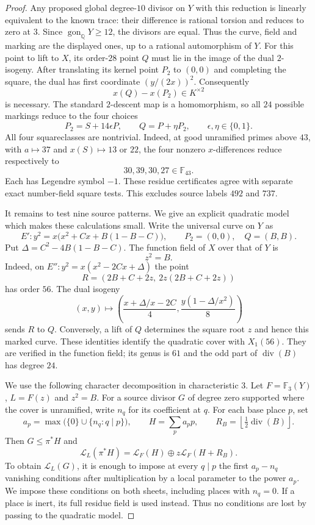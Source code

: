 \begin{proof}
Any proposed global degree-$10$ divisor on $Y$ with this reduction
is linearly equivalent to the known trace: their difference is
rational torsion and reduces to zero at $3$. Since
$\operatorname{gon}_{\mathbb Q}Y\geq12$, the divisors are equal.
Thus the curve, field and marking are the displayed ones, up to
a rational automorphism of $Y$.
For this point to lift to $X$, its order-$28$ point $Q$ must lie
in the image of the dual $2$-isogeny. After translating its kernel
point $P_2$ to $(0,0)$ and completing the square, the dual has
first coordinate $(y/(2x))^2$. Consequently
\[
                         x(Q)-x(P_2)\in K^{\times2}
\]
is necessary. The standard $2$-descent map is a homomorphism, so
all $24$ possible markings reduce to the four choices
\[
 P_2=S+14\epsilon P,\qquad Q=P+\eta P_2,
 \qquad\epsilon,\eta\in\{0,1\}.
\]
All four squareclasses are nontrivial. Indeed, at good unramified
primes above $43$, with $a\mapsto37$ and $x(S)\mapsto13$ or $22$,
the four nonzero $x$-differences reduce respectively to
\[
                         30,39,30,27\in\mathbb F_{43}.
\]
Each has Legendre symbol $-1$. These residue certificates agree
with separate exact number-field square tests. This excludes
source labels $492$ and $737$.

It remains to test nine source patterns. We give an explicit
quadratic model which makes these calculations small.
Write the universal curve on $Y$ as
\[
 E':y^2=x\bigl(x^2+Cx+B(1-B-C)\bigr),\qquad
 P_2=(0,0),\quad Q=(B,B).
\]
Put $\Delta=C^2-4B(1-B-C)$. The function field of $X$ over that
of $Y$ is
\[
                           z^2=B.
\]
Indeed, on $E'':y^2=x(x^2-2Cx+\Delta)$ the point
\[
 R=(2B+C+2z,\ 2z(2B+C+2z))
\]
has order $56$. The dual isogeny
\[
 (x,y)\longmapsto
 \left(\frac{x+\Delta/x-2C}{4},
       \frac{y(1-\Delta/x^2)}8\right)
\]
sends $R$ to $Q$. Conversely, a lift of $Q$ determines the
square root $z$ and hence this marked curve. These identities
identify the quadratic cover with $X_1(56)$. They are verified
in the function field; its genus is $61$ and the odd part of
$\operatorname{div}(B)$ has degree $24$.

We use the following character decomposition in characteristic
$3$. Let $F=\mathbb F_3(Y)$, $L=F(z)$ and $z^2=B$. For a
source divisor $G$ of degree zero supported where the cover is
unramified, write $n_q$ for its coefficient at $q$. For each
base place $p$, set
\[
 a_p=\max\bigl(\{0\}\cup\{n_q:q\mid p\}\bigr),\qquad
 H=\sum_p a_pp,\qquad
 R_B=\left\lfloor\tfrac12\operatorname{div}(B)\right\rfloor.
\]
Then $G\leq\pi^*H$ and
\[
 \mathcal L_L(\pi^*H)
 =\mathcal L_F(H)\oplus z\mathcal L_F(H+R_B).
\]
To obtain $\mathcal L_L(G)$, it is enough to impose at every
$q\mid p$ the first $a_p-n_q$ vanishing conditions after
multiplication by a local parameter to the power $a_p$.
We impose these conditions on both sheets, including places
with $n_q=0$. If a place is inert, its full residue field is
used instead. Thus no conditions are lost by passing to the
quadratic model.


\end{proof}
